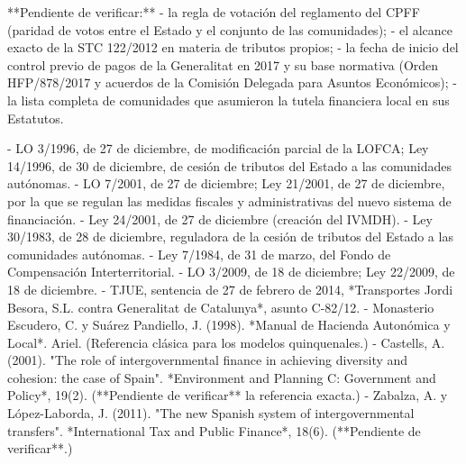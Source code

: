 \documentclass[10pt,a4paper]{article}
\begin{document}
{**Pendiente de verificar:**
- la regla de votación del reglamento del CPFF (paridad de votos entre el Estado y el conjunto de las comunidades);
- el alcance exacto de la STC 122/2012 en materia de tributos propios;
- la fecha de inicio del control previo de pagos de la Generalitat en 2017 y su base normativa (Orden HFP/878/2017 y acuerdos de la Comisión Delegada para Asuntos Económicos);
- la lista completa de comunidades que asumieron la tutela financiera local en sus Estatutos.

- LO 3/1996, de 27 de diciembre, de modificación parcial de la LOFCA; Ley 14/1996, de 30 de diciembre, de cesión de tributos del Estado a las comunidades autónomas.
- LO 7/2001, de 27 de diciembre; Ley 21/2001, de 27 de diciembre, por la que se regulan las medidas fiscales y administrativas del nuevo sistema de financiación.
- Ley 24/2001, de 27 de diciembre (creación del IVMDH).
- Ley 30/1983, de 28 de diciembre, reguladora de la cesión de tributos del Estado a las comunidades autónomas.
- Ley 7/1984, de 31 de marzo, del Fondo de Compensación Interterritorial.
- LO 3/2009, de 18 de diciembre; Ley 22/2009, de 18 de diciembre.
- TJUE, sentencia de 27 de febrero de 2014, *Transportes Jordi Besora, S.L. contra Generalitat de Catalunya*, asunto C-82/12.
- Monasterio Escudero, C. y Suárez Pandiello, J. (1998). *Manual de Hacienda Autonómica y Local*. Ariel. (Referencia clásica para los modelos quinquenales.)
- Castells, A. (2001). "The role of intergovernmental finance in achieving diversity and cohesion: the case of Spain". *Environment and Planning C: Government and Policy*, 19(2). (**Pendiente de verificar** la referencia exacta.)
- Zabalza, A. y López-Laborda, J. (2011). "The new Spanish system of intergovernmental transfers". *International Tax and Public Finance*, 18(6). (**Pendiente de verificar**.)

}
\end{document}
